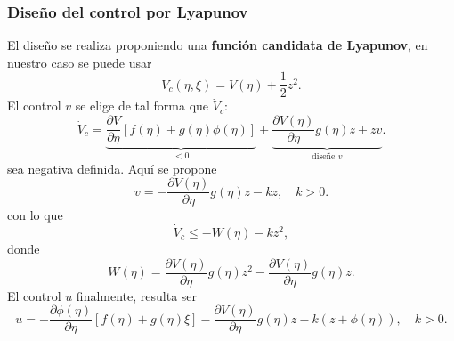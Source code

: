 \subsubsection{Diseño del control por Lyapunov} El diseño se realiza proponiendo una \textbf{función candidata de Lyapunov}, en nuestro caso se puede usar
\begin{equation*}
	V_c(\eta, \xi) = V(\eta) + \dfrac{1}{2}z^2.
\end{equation*}
El control $v$ se elige de tal forma que $\dot{V}_c$:
\begin{equation*}
	\dot{V}_c = \underbrace{\dfrac{\partial V}{\partial \eta} [f(\eta) + g(\eta)\phi(\eta)]}_{<0} + \underbrace{\dfrac{\partial V(\eta)}{\partial \eta}g(\eta)z + zv}_{\text{diseñe } v}.
\end{equation*}
sea negativa definida. Aquí se propone
\begin{equation*}
	v = -\dfrac{\partial V(\eta)}{\partial \eta}g(\eta)z - kz, \quad k > 0.
\end{equation*}
con lo que
\begin{equation*}
	\dot{V}_c \leq -W(\eta) -kz^2,
\end{equation*}
donde
\begin{equation*}
	W(\eta) = \dfrac{\partial V(\eta)}{\partial \eta}g(\eta)z^2 - \dfrac{\partial V(\eta)}{\partial \eta}g(\eta)z.
\end{equation*}
El control $u$ finalmente, resulta ser
\begin{equation*}
	u = -\dfrac{\partial \phi(\eta)}{\partial \eta} [f(\eta) + g(\eta)\xi] - \dfrac{\partial V(\eta)}{\partial \eta}g(\eta)z - k(z + \phi(\eta)), \quad k > 0.
\end{equation*}

